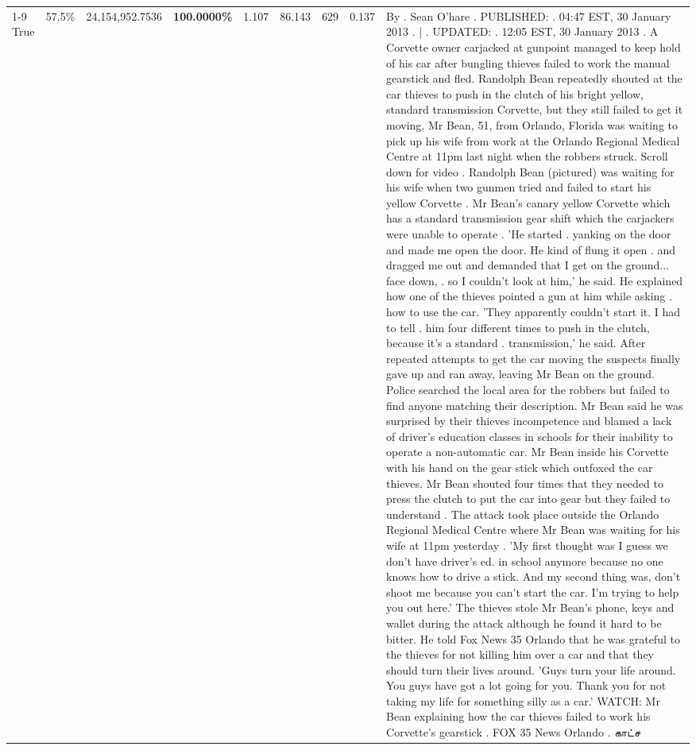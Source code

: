 \begin{table}[H]
\begin{tabular}{lllrlllll}
\cline{1-9} \cline{2-9}
True & 57.5\% & 24,154,952.7536 & \bfseries \color{red} 100.0000\% & 1.107 & 86.143 & 629 & 0.137 & By . Sean O'hare . PUBLISHED: . 04:47 EST, 30 January 2013 . | . UPDATED: . 12:05 EST, 30 January 2013 . A Corvette owner carjacked at gunpoint managed to keep hold of his car after bungling thieves failed to work the manual gearstick and fled. Randolph Bean repeatedly shouted at the car thieves to push in the clutch of his bright yellow, standard transmission Corvette, but they still failed to get it moving. Mr Bean, 51, from Orlando, Florida was waiting to pick up his wife from work at the Orlando Regional Medical Centre at 11pm last night when the robbers struck. Scroll down for video . Randolph Bean (pictured) was waiting for his wife when two gunmen tried and failed to start his yellow Corvette . Mr Bean's canary yellow Corvette which has a standard transmission gear shift which the carjackers were unable to operate . 'He started . yanking on the door and made me open the door. He kind of flung it open . and dragged me out and demanded that I get on the ground... face down, . so I couldn't look at him,' he said. He explained how one of the thieves pointed a gun at him while asking . how to use the car. 'They apparently couldn't start it. I had to tell . him four different times to push in the clutch, because it's a standard . transmission,' he said. After repeated attempts to get the car moving the suspects finally gave up and ran away, leaving Mr Bean on the ground. Police searched the local area for the robbers but failed to find anyone matching their description. Mr Bean said he was surprised by their thieves incompetence and blamed a lack of driver's education classes in schools for their inability to operate a non-automatic car. Mr Bean inside his Corvette with his hand on the gear stick which outfoxed the car thieves. Mr Bean shouted four times that they needed to press the clutch to put the car into gear but they failed to understand . The attack took place outside the Orlando Regional Medical Centre where Mr Bean was waiting for his wife at 11pm yesterday . 'My first thought was I guess we don't have driver's ed. in school anymore because no one knows how to drive a stick. And my second thing was, don't shoot me because you can't start the car. I'm trying to help you out here.' The thieves stole Mr Bean's phone, keys and wallet during the attack although he found it hard to be bitter. He told Fox News 35 Orlando that he was grateful to the thieves for not killing him over a car and that they should turn their lives around. 'Guys turn your life around. You guys have got a lot going for you. Thank you for not taking my life for something silly as a car.' WATCH: Mr Bean explaining how the car thieves failed to work his Corvette's gearstick . FOX 35 News Orlando . காட்ச \\

\end{tabular}
\end{table}

